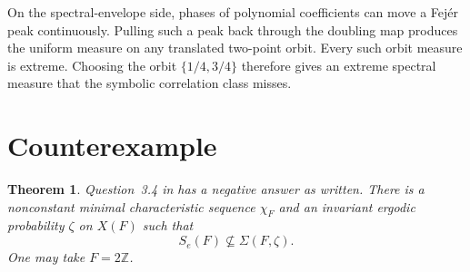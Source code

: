 \documentclass[11pt]{article}
\newtheorem{theorem}{Theorem}
\newcommand{\Z}{\mathbb Z}
\begin{document}
On the spectral-envelope side, phases of polynomial coefficients can move a
Fejér peak continuously. Pulling such a peak back through the doubling map
produces the uniform measure on any translated two-point orbit. Every such
orbit measure is extreme. Choosing the orbit $\{1/4,3/4\}$ therefore gives an
extreme spectral measure that the symbolic correlation class misses.

\section*{Counterexample}

\begin{theorem}\label{thm:main}
Question~3.4 in \cite{Lawton} has a negative answer as written. There is a
nonconstant minimal characteristic sequence $\chi_F$ and an invariant ergodic
probability $\zeta$ on $X(F)$ such that
\[
 S_e(F)\not\subseteq\Sigma(F,\zeta).
\]
One may take $F=2\Z$.
\end{theorem}
\end{document}
